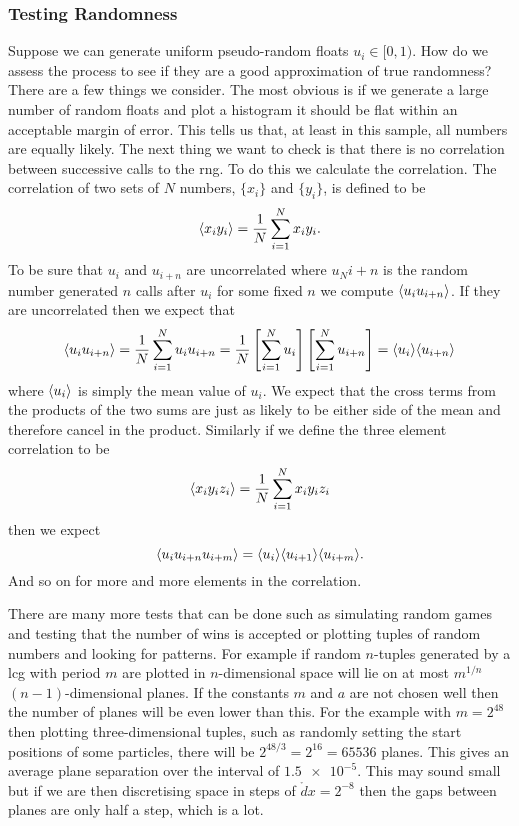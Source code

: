 \documentclass[a4paper]{article}
\begin{document}
    \subsubsection{Testing Randomness}
    Suppose we can generate uniform pseudo-random floats \(u_i\in[0, 1)\).
    How do we assess the process to see if they are a good approximation of true randomness?
    There are a few things we consider.
    The most obvious is if we generate a large number of random floats and plot a histogram it should be flat within an acceptable margin of error.
    This tells us that, at least in this sample, all numbers are equally likely.
    The next thing we want to check is that there is no correlation between successive calls to the \gls{rng}.
    To do this we calculate the correlation.
    The correlation of two sets of \(N\) numbers, \(\{x_i\}\) and \(\{y_i\}\), is defined to be
    \[\langle{x_iy_i}\rangle = \frac{1}{N}\sum_{i=1}^{N} x_iy_i.\]
    To be sure that \(u_i\) and \(u_{i+n}\) are uncorrelated where \(u_N{i+n}\) is the random number generated \(n\) calls after \(u_i\) for some fixed \(n\) we compute \(\langle{u_iu_{i+n}}\rangle\).
    If they are uncorrelated then we expect that 
    \[\langle{u_iu_{i+n}}\rangle = \frac{1}{N}\sum_{i=1}^{N}u_iu_{i+n} = \frac{1}{N}\left[\sum_{i=1}^{N}u_i\right] \left[\sum_{i=1}^{N}u_{i+n}\right] = \langle{u_i}\rangle\langle{u_{i+n}}\rangle\]
    where \(\langle{u_i}\rangle\) is simply the mean value of \(u_i\).
    We expect that the cross terms from the products of the two sums are just as likely to be either side of the mean and therefore cancel in the product.
    Similarly if we define the three element correlation to be
    \[\langle{x_iy_iz_i}\rangle = \frac{1}{N}\sum_{i=1}^{N} x_iy_iz_i\]
    then we expect
    \[\langle{u_iu_{i+n}u_{i+m}}\rangle = \langle{u_i}\rangle\langle{u_{i+1}}\rangle\langle{u_{i+m}}\rangle.\]
    And so on for more and more elements in the correlation.
    
    There are many more tests that can be done such as simulating random games and testing that the number of wins is accepted or plotting tuples of random numbers and looking for patterns.
    For example if random \(n\)-tuples generated by a \gls{lcg} with period \(m\) are plotted in \(n\)-dimensional space will lie on at most \(m^{1/n}\) \((n-1)\)-dimensional planes.
    If the constants \(m\) and \(a\) are not chosen well then the number of planes will be even lower than this.
    For the example with \(m = 2^48\) then plotting three-dimensional tuples, such as randomly setting the start positions of some particles, there will be \(2^{48/3} = 2^{16} = 65536\) planes.
    This gives an average plane separation over the interval of \(\num{1.5e-5}\).
    This may sound small but if we are then discretising space in steps of \(\mathring{d}x = 2^{-8}\) then the gaps between planes are only half a step, which is a lot.
    
\end{document}
